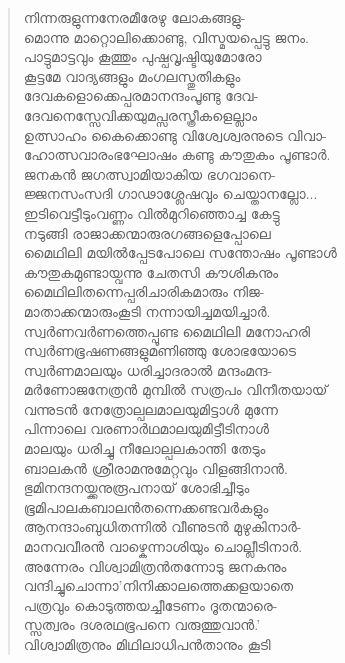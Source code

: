 \begin{verse}
നിന്നരുളുന്നനേരമീരേഴു ലോകങ്ങളു-\\
മൊന്നു മാറ്റൊലിക്കൊണ്ടു, വിസ്മയപ്പെട്ടു ജനം.\\
പാട്ടുമാട്ടവും കൂത്തും പുഷ്പവൃഷ്ടിയുമോരോ\\
കൂട്ടമേ വാദ്യങ്ങളും മംഗലസ്തുതികളും\\
ദേവകളൊക്കെപ്പരമാനന്ദംപൂണ്ടു ദേവ-\\
ദേവനെസ്സേവിക്കയുമപ്സരസ്ത്രീകളെല്ലാം\\
ഉത്സാഹം കൈക്കൊണ്ടു വിശ്വേശ്വരനുടെ വിവാ-\\
ഹോത്സവാരംഭഘോഷം കണ്ടു കൗതുകം പൂണ്ടാര്‍.\\
ജനകന്‍ ജഗത്സ്വാമിയാകിയ ഭഗവാനെ-\\
ജ്ജനസംസദി ഗാഢാശ്ലേഷവും ചെയ്താനല്ലോ...\\
ഇടിവെട്ടീടുംവണ്ണം വില്‍മുറിഞ്ഞൊച്ച കേട്ടു\\
നടുങ്ങി രാജാക്കന്മാരുരഗങ്ങളെപ്പോലെ\\
മൈഥിലി മയില്‍പ്പേടപോലെ സന്തോഷം പൂണ്ടാള്‍\\
കൗതുകമുണ്ടായ്വന്നു ചേതസി കൗശികനും\\
മൈഥിലിതന്നെപ്പരിചാരികമാരും നിജ-\\
മാതാക്കന്മാരുംകൂടി നന്നായിച്ചമയിച്ചാര്‍.\\
സ്വര്‍ണവര്‍ണത്തെപ്പൂണ്ട മൈഥിലി മനോഹരി\\
സ്വര്‍ണഭൂഷണങ്ങളുമണിഞ്ഞു ശോഭയോടെ\\
സ്വര്‍ണമാലയും ധരിച്ചാദരാല്‍ മന്ദംമന്ദ-\\
മര്‍ണോജനേത്രന്‍ മുമ്പില്‍ സത്രപം വിനീതയായ്\\
വന്നുടന്‍ നേത്രോല്പലമാലയുമിട്ടാള്‍ മുന്നേ\\
പിന്നാലെ വരണാര്‍ഥമാലയുമിട്ടീടിനാള്‍\\
മാലയും ധരിച്ചു നീലോല്പലകാന്തി തേടും\\
ബാലകന്‍ ശ്രീരാമനുമേറ്റവും വിളങ്ങിനാന്‍.\\
ഭുമിനന്ദനയ്ക്കനുരൂപനായ് ശോഭിച്ചീടും\\
ഭൂമിപാലകബാലന്‍തന്നെക്കണ്ടവര്‍കളും\\
ആനന്ദാംബുധിതന്നില്‍ വീണുടന്‍ മുഴുകിനാര്‍-\\
മാനവവീരന്‍ വാഴ്കെന്നാശിയും ചൊല്ലീടിനാര്‍.\\
അന്നേരം വിശ്വാമിത്രന്‍തന്നോടു ജനകനും\\
വന്ദിച്ചുചൊന്നാ’നിനിക്കാലത്തെക്കളയാതെ\\
പത്രവും കൊടുത്തയച്ചീടേണം ദൂതന്മാരെ-\\
സ്സത്വരം ദശരഥഭൂപനെ വരുത്തുവാന്‍.’\\
വിശ്വാമിത്രനും മിഥിലാധിപന്‍താനും കൂടി\\

\end{verse}

